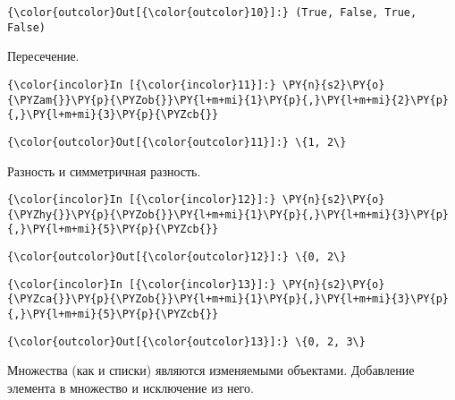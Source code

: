             \begin{Verbatim}[commandchars=\\\{\}]
{\color{outcolor}Out[{\color{outcolor}10}]:} (True, False, True, False)
\end{Verbatim}
        
    Пересечение.

    \begin{Verbatim}[commandchars=\\\{\}]
{\color{incolor}In [{\color{incolor}11}]:} \PY{n}{s2}\PY{o}{\PYZam{}}\PY{p}{\PYZob{}}\PY{l+m+mi}{1}\PY{p}{,}\PY{l+m+mi}{2}\PY{p}{,}\PY{l+m+mi}{3}\PY{p}{\PYZcb{}}
\end{Verbatim}

            \begin{Verbatim}[commandchars=\\\{\}]
{\color{outcolor}Out[{\color{outcolor}11}]:} \{1, 2\}
\end{Verbatim}
        
    Разность и симметричная разность.

    \begin{Verbatim}[commandchars=\\\{\}]
{\color{incolor}In [{\color{incolor}12}]:} \PY{n}{s2}\PY{o}{\PYZhy{}}\PY{p}{\PYZob{}}\PY{l+m+mi}{1}\PY{p}{,}\PY{l+m+mi}{3}\PY{p}{,}\PY{l+m+mi}{5}\PY{p}{\PYZcb{}}
\end{Verbatim}

            \begin{Verbatim}[commandchars=\\\{\}]
{\color{outcolor}Out[{\color{outcolor}12}]:} \{0, 2\}
\end{Verbatim}
        
    \begin{Verbatim}[commandchars=\\\{\}]
{\color{incolor}In [{\color{incolor}13}]:} \PY{n}{s2}\PY{o}{\PYZca{}}\PY{p}{\PYZob{}}\PY{l+m+mi}{1}\PY{p}{,}\PY{l+m+mi}{3}\PY{p}{,}\PY{l+m+mi}{5}\PY{p}{\PYZcb{}}
\end{Verbatim}

            \begin{Verbatim}[commandchars=\\\{\}]
{\color{outcolor}Out[{\color{outcolor}13}]:} \{0, 2, 3\}
\end{Verbatim}
        
    Множества (как и списки) являются изменяемыми объектами. Добавление
элемента в множество и исключение из него.


